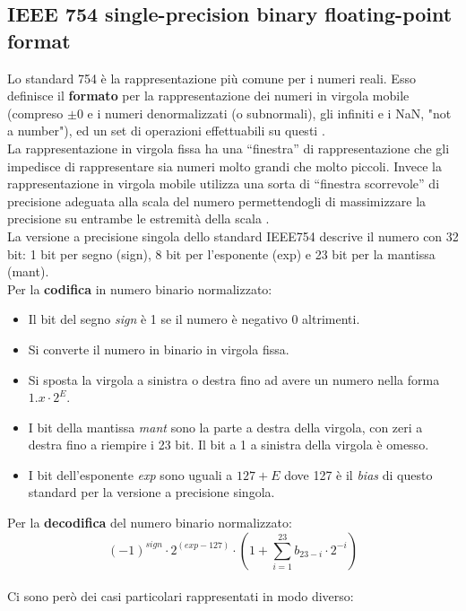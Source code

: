 \documentclass[]{IEEEtran}
\begin{document}
\subsection{IEEE 754 single-precision binary floating-point format}
Lo standard 754\cite{IEEE754} è la rappresentazione più comune per i numeri reali. Esso definisce il \textbf{formato} per la rappresentazione dei numeri in virgola mobile (compreso $\pm 0$ e i numeri denormalizzati (o subnormali), gli infiniti e i NaN, "not a number"), ed un set di operazioni effettuabili su questi \cite{IEEE754Wiki}.
\\La rappresentazione in virgola fissa ha una ``finestra'' di rappresentazione che gli impedisce di rappresentare sia numeri molto grandi che molto piccoli. Invece la rappresentazione in virgola mobile utilizza una sorta di ``finestra scorrevole'' di precisione adeguata alla scala del numero permettendogli di massimizzare la precisione su entrambe le estremità della scala \cite{IEEE754Online}.
\\La versione a precisione singola dello standard IEEE754 descrive il numero con 32 bit: 1 bit per segno (sign), 8 bit per l'esponente (exp) e 23 bit per la mantissa (mant).
\\Per la \textbf{codifica} in numero binario normalizzato:
\begin{itemize}
    \item Il bit del segno \textit{sign} è 1 se il numero è negativo 0 altrimenti.
    \item Si converte il numero in binario in virgola fissa.
    \item Si sposta la virgola a sinistra o destra fino ad avere un numero nella forma $1.x \cdot 2^{E}$.
    \item I bit della mantissa \textit{mant} sono la parte a destra della virgola, con zeri a destra fino a riempire i 23 bit. Il bit a 1 a sinistra della virgola è omesso.
    \item I bit dell'esponente \textit{exp} sono uguali a $127+E$ dove 127 è il \textit{bias} di questo standard per la versione a precisione singola.
\end{itemize}
Per la \textbf{decodifica} del numero binario normalizzato: $$(-1)^{sign}\cdot 2^{(exp-127)} \cdot (1 + \sum_{i=1}^{23}b_{23-i}\cdot 2^{-i})$$
\\Ci sono però dei casi particolari rappresentati in modo diverso:
\end{document}
